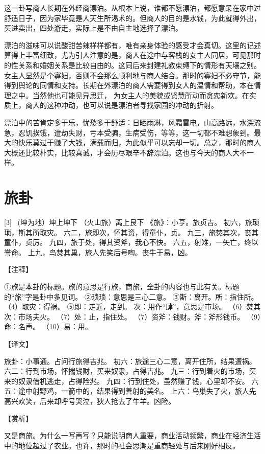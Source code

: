 \documentclass[12pt,UTF8]{ctexbook}
\begin{document}
这一卦写商人长期在外经商漂泊。从根本上说，谁都不愿漂泊，都愿意呆在家中过舒适日子，因为家毕竟是人天生所渴术的。但商人的目的是水钱，为此就得外出，买进卖出，四处游走，实际上是不由自主地选择了漂泊。

漂泊的滋味可以说酸甜苦辣样样都有，唯有亲身体验的感受才会真切。这里的记述算得上丰富细致，尤为引人注意的是，商人在途中与客栈的女主人同居，可见那时的性关系和婚姻关系是比较自由的。这同后来封建礼教束缚下的情形有天壤之别。女主人显然是个寡妇，否则不会那么顺利地与商人结合。那时的寡妇不必守节，能得到舆论的同情和支持。长期在外漂泊的商人需要得到女人的温情和帮助，本在情理之中。当然他也可能见异思迁， 为女主人的美貌或贤慧所动而贪恋新欢。在实质上，商人的这种冲动，也可以说是漂泊者寻找家园的冲动的折射。

漂泊中的苦肯定多于乐，忧愁多于舒适：日晒雨淋，风霜雷电，山高路远，水深流急，忍饥挨饿，遭劫失财，亏本受骗，生病受伤，等等，这一切都不难想象到。最大的快乐莫过于赚了大钱，满载而归，为此似乎可以忘却一切。总之，那时的商人大概还比较朴实，比较真诚，才会历尽艰辛不辞漂泊。这也与今天的商人大不一样。

\chapter{旅卦}
[3] \ (坤为地）坤上坤下
（火山旅）离上艮下
《旅》：小亨。旅贞吉。
初六，旅琐琐，斯其所取灾。
六二，旅即次，怀其资，得童仆，贞。
九三，旅焚其次，丧其童仆，贞厉。
九四，旅于处，得其资斧，我心不快。
六五，射雉，一矢亡，终以誉命。
上九，鸟焚其巢，旅人先笑后号啕。丧牛于易，凶。

【注释】

①旅是本卦的标题。旅的意思是行旅，商旅，全卦的内容也与此有关。标题的“旅”字是卦中多见词。
②琐琐：意思是三心二意。
③斯：离开。所：指住所。
（4）取灾：得祸。
⑤即：走近，走到。 次：用作“肆”，意思是市场。
（6）焚其次：市场夫火。
（7）处：止，指住处。
（7）资斧：钱财。斧：斧形钱币。
（9）命：名声。
（10）易：用。

【译文】

旅卦：小事通。占问行旅得吉兆。
初六：旅途三心二意，离开住所，结果遭祸。
六二：行到市场，怀揣钱财，买来奴隶，占得吉兆。
九三：行到着火的市场，买来的奴隶借机逃走，占得险兆。
九四：行到住处，虽然赚了钱，心里却不安。
六五：途中射野鸡，一箭中的，结果得到善射的美名。
上六：鸟巢失了火，旅人先高兴欢笑，后来却呼号哭泣，狄人抢去了牛羊。凶险。

【赏析】

又是商旅。为什么一写再写？只能说明商人重要，商业活动频繁，商业在经济生活中的地位超过了农业。也许，那时的社会思潮是重商轻处与后来刚好相反。
\end{document}
